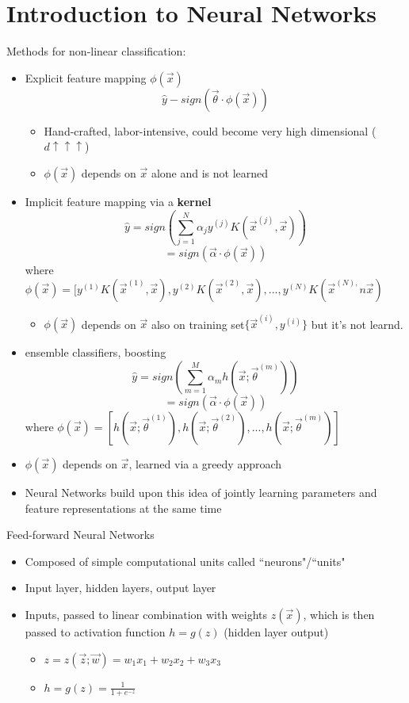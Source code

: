 \documentclass[10pt, oneside]{article}
\begin{document}
\section{Introduction to Neural Networks}
Methods for non-linear classification:
\begin{itemize}
    \item Explicit feature mapping $\phi(\vec x)$
    \[\hat y - sign(\vec \theta \cdot \phi (\vec x))\]
    \begin{itemize}
        \item Hand-crafted, labor-intensive, could become very high dimensional ($d\uparrow \uparrow \uparrow$)
        \item $\phi(\vec x)$ depends on $\vec x$ alone and is not learned
    \end{itemize}
    \item Implicit feature mapping via a \textbf{kernel}
    \[\hat y = sign(\sum_{j=1}^N \alpha_j y^{(j)} K(\vec x^{(j)}, \vec x))\]
    \[=sign(\vec \alpha \cdot \phi(\vec x))\]
    where $\phi(\vec x) = [y^{(1)} K(\vec x^{(1)}, \vec x), y^{(2)} K(\vec x^{(2)}, \vec x), ..., y^{(N)} K(\vec x^{(N),}n \vec x)$
    \begin{itemize}
        \item $\phi(\vec x)$ depends on $\vec x$ also on training set$\{\vec x^{(i)}, y^{(i)}\}$ but it's not learnd.
    \end{itemize}
    \item ensemble classifiers, boosting
    \[\hat y = sign(\sum_{m=1}^M \alpha_m h(\vec x; \vec \theta^{(m)}))\]
    \[=sign(\vec \alpha \cdot \phi(\vec x))\]
    where $\phi(\vec x) = [h(\vec x; \vec \theta^{(1)}), h(\vec x; \vec \theta^{(2)}), ..., h(\vec x; \vec \theta^{(m)})]$
    \item $\phi(\vec x)$ depends on $\vec x$, learned via a greedy approach
    \item Neural Networks build upon this idea of jointly learning parameters and feature representations at the same time
\end{itemize}
Feed-forward Neural Networks
\begin{itemize}
    \item Composed of simple computational units called ``neurons"/``units"
    \item Input layer, hidden layers, output layer
    \item Inputs, passed to linear combination with weights $z(\vec x)$, which is then passed to activation function $h=g(z)$ (hidden layer output)
    \begin{itemize}
        \item $z=z(\vec z;\vec w) = w_1 x_1 + w_2 x_2 + w_3 x_3$
        \item $h=g(z) = \frac{1}{1+e^{-z}}$
    \end{itemize}
\end{itemize}
\end{document}
